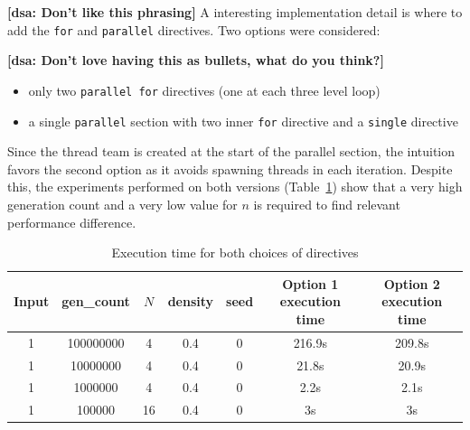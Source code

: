 \documentclass{article}
\newcommand{\dsanote}[1]{\textbf{[dsa: #1]}}
\begin{document}
\dsanote{Don't like this phrasing}
A interesting implementation detail is where to add the \texttt{for} and \texttt{parallel}
directives. Two options were considered:

\dsanote{Don't love having this as bullets, what do you think?}

\begin{itemize}
	\itemsep -0.2em
	\item only two \texttt{parallel for} directives (one at each three level
		loop)

	\item a single \texttt{parallel} section with two inner \texttt{for}
		directive and a \texttt{single} directive

\end{itemize}

Since the thread team is created at the start of the parallel section, the intuition
favors the second option as it avoids spawning threads in each iteration.
Despite this, the experiments performed on both versions
(Table~\ref{omp-directive-choice}) show that a very high generation count and a
very low value for $n$ is required to find relevant performance difference.

\begin{table}[h!]
	\centering
	\begin{tabular}{||c c c c c c c||} 
	 \hline
	 Input & gen\_count & $N$ & density & seed & Option 1 execution time & Option 2 execution time \\ [0.5ex] 
	 \hline\hline
	 1 & 100000000 & 4 & 0.4 & 0 & 216.9s & 209.8s \\ 
	 1 & 10000000 & 4 & 0.4 & 0 & 21.8s & 20.9s \\ 
	 1 & 1000000 & 4 & 0.4 & 0 & 2.2s & 2.1s\\
	 1 & 100000 & 16 & 0.4 & 0 & 3s & 3s\\ [1ex] 
	 \hline
	\end{tabular}
	\caption{Execution time for both choices of directives}
	\label{omp-directive-choice}
\end{table}

\end{document}
